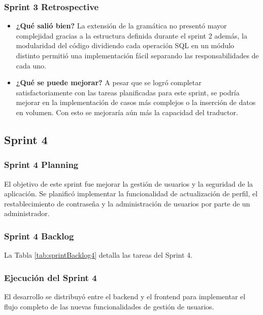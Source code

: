 \subsubsection{Sprint 3 Retrospective}
\begin{itemize}
    \item \textbf{¿Qué salió bien?} \newline
    La extensión de la gramática no presentó mayor complejidad gracias a la estructura definida durante el sprint 2 además, la modularidad del código dividiendo cada operación SQL en un módulo distinto permitió una implementación fácil separando las responsabilidades de cada uno.
    
    \item \textbf{¿Qué se puede mejorar?} \newline
    A pesar que se logró completar satisfactoriamente con las tareas planificadas para este sprint, se podría mejorar en la implementación de casos más complejos o la inserción de datos en volumen. Con esto se mejoraría aún más la capacidad del traductor.
    
\end{itemize}


\subsection{Sprint 4}
\subsubsection{Sprint 4 Planning}
El objetivo de este sprint fue mejorar la gestión de usuarios y la seguridad de la aplicación. Se planificó implementar la funcionalidad de actualización de perfil, el restablecimiento de contraseña y la administración de usuarios por parte de un administrador.

\subsubsection{Sprint 4 Backlog}
La Tabla \ref{tab:sprintBacklog4} detalla las tareas del Sprint 4.




\subsubsection{Ejecución del Sprint 4}
El desarrollo se distribuyó entre el backend y el frontend para implementar el flujo completo de las nuevas funcionalidades de gestión de usuarios.

